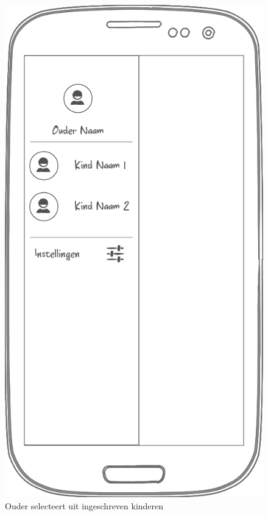 \documentclass[a4paper]{article}
\begin{document}
\begin{appendices}
\newpage
\begin{figure}[H]
  \centerline{\includegraphics[width=\textwidth*4/5]{mobiel_kies_kind}}
  \caption{Ouder selecteert uit ingeschreven kinderen}
  \label{fig:mobiel_kies_kind}
\end{figure}

\end{appendices}

\newpage


\end{document}
